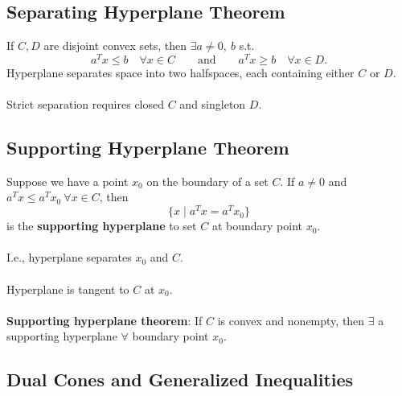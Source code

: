 \documentclass[]{article}
\begin{document}
\subsection*{Separating Hyperplane Theorem}
If $C, D$ are disjoint convex sets, then $\exists a\neq 0, \ b$ s.t. $$ a^{T}x \leq b \quad \forall x\in C \qquad \text{and} \qquad a^{T}x \geq b \quad \forall x\in D.$$
Hyperplane separates space into two halfspaces, each containing either $C$ or $D$. \\\\
Strict separation requires closed $C$ and singleton $D$. \\ 

\subsection*{Supporting Hyperplane Theorem}
Suppose we have a point $x_{0}$ on the boundary of a set $C$. If $a\neq 0$ and $a^{T}x\leq a^{T}x_{0} \ \forall x\in C$, then $$\{x \mid a^{T}x=a^{T}x_{0}\}$$ is the \textbf{supporting hyperplane} to set $C$ at boundary point $x_{0}$. \\\\
I.e., hyperplane separates $x_{0}$ and $C$. \\\\
Hyperplane is tangent to $C$ at $x_{0}$. \\\\
\textbf{Supporting hyperplane theorem}: If $C$ is convex and nonempty, then $\exists$ a supporting hyperplane $\forall$ boundary point $x_{0}$. \\

\subsection*{Dual Cones and Generalized Inequalities}
\end{document}
